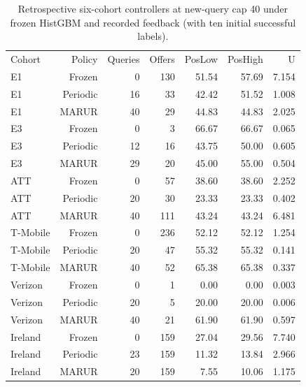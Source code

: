 \begin{table}[!ht]
\centering\small
\caption{Retrospective six-cohort controllers at new-query cap 40 under frozen HistGBM and recorded feedback (with ten initial successful labels).}
\begin{tabular}{lrrrrrr}
\hline
Cohort & Policy & Queries & Offers & PosLow & PosHigh & U \\
E1 & Frozen & 0 & 130 & 51.54 & 57.69 & 7.154 \\
E1 & Periodic & 16 & 33 & 42.42 & 51.52 & 1.008 \\
E1 & MARUR & 40 & 29 & 44.83 & 44.83 & 2.025 \\
E3 & Frozen & 0 & 3 & 66.67 & 66.67 & 0.065 \\
E3 & Periodic & 12 & 16 & 43.75 & 50.00 & 0.605 \\
E3 & MARUR & 29 & 20 & 45.00 & 55.00 & 0.504 \\
ATT & Frozen & 0 & 57 & 38.60 & 38.60 & 2.252 \\
ATT & Periodic & 20 & 30 & 23.33 & 23.33 & 0.402 \\
ATT & MARUR & 40 & 111 & 43.24 & 43.24 & 6.481 \\
T-Mobile & Frozen & 0 & 236 & 52.12 & 52.12 & 1.254 \\
T-Mobile & Periodic & 20 & 47 & 55.32 & 55.32 & 0.141 \\
T-Mobile & MARUR & 40 & 52 & 65.38 & 65.38 & 0.337 \\
Verizon & Frozen & 0 & 1 & 0.00 & 0.00 & 0.003 \\
Verizon & Periodic & 20 & 5 & 20.00 & 20.00 & 0.006 \\
Verizon & MARUR & 40 & 21 & 61.90 & 61.90 & 0.597 \\
Ireland & Frozen & 0 & 159 & 27.04 & 29.56 & 7.740 \\
Ireland & Periodic & 23 & 159 & 11.32 & 13.84 & 2.966 \\
Ireland & MARUR & 20 & 159 & 7.55 & 10.06 & 1.175 \\
\hline
\end{tabular}
\end{table}
